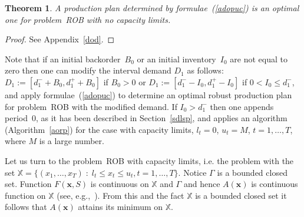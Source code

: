 \documentclass[11pt]{article}
\newtheorem{thm}{Theorem}
\newcommand{\Xset}{\mathbb{X}}
\begin{document}
\begin{thm}
A production plan determined by formulae~(\ref{adopuc}) is
an optimal one for problem~\textsc{ROB} with no capacity
limits.
\label{tncrob}
\end{thm}
\begin{proof}
See Appendix~\ref{dod}.
\end{proof}
Note that 
if   an initial backorder~$B_0$ or an initial inventory~$I_0$
are not equal to zero then one can modify the interval demand $D_1$ as follows:
$D_1:=[d^{-}_1+B_0, d^{+}_1+B_0]$  if $B_0>0$ or
$D_1:=[d^{-}_1-I_0, d^{+}_1-I_0]$ if $0<I_0\leq d^{-}_1$,
and apply 
formulae~(\ref{adopuc}) to determine an optimal robust production plan for  problem~\textsc{ROB}
with the modified demand.
If $I_0> d^{-}_1$ then one appends period~$0$, as it has been described in Section~\ref{sdlsp},
and  applies an algorithm (Algorithm~\ref{aorp}) for the case with  capacity
limits, $l_t=0$, $u_t=M$, $t=1,\ldots,T$, where $M$ is a large number.


Let us turn to  the problem~\textsc{ROB} with  capacity
limits, i.e. the problem with the set 
$\Xset=\{(x_1,\ldots,x_{T})\;:\;
l_t\leq x_t\leq u_t, t=1,\ldots,T\}$.
Notice $\Gamma$ is a bounded closed set.
Function $F(\pmb{x},S)$ is continuous on 
$\Xset$ and $\Gamma$ and hence $A(\pmb{x})$ is continuous
function on $\Xset$ (see, e.g.,~\cite[Theorem~1.4]{M70}). From this and  the fact
$\Xset$ is a bounded closed set it follows that 
$A(\pmb{x})$ attains its minimum on $\Xset$.
\end{document}
